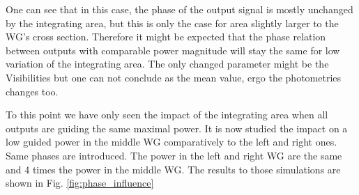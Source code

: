One can see that in this case, the phase of the output signal is
mostly unchanged by the integrating area, but this is only the case
for area slightly larger to the WG's cross section. Therefore it
might be expected that the phase relation between outputs with
comparable power magnitude will stay the same for low variation of the
integrating area. The only changed parameter might be the Visibilities
but one can not conclude as the mean value, ergo the photometries changes too.

To this point we have only seen the impact of the integrating area when all outputs are guiding the same maximal power. It is now studied the impact on a low guided power in the middle WG
comparatively to the left and right ones. Same phases are
introduced. The power in the left and right WG are the same and 4
times the power in the middle WG. The results to those simulations are
shown in Fig. \ref{fig:phase_influence}
